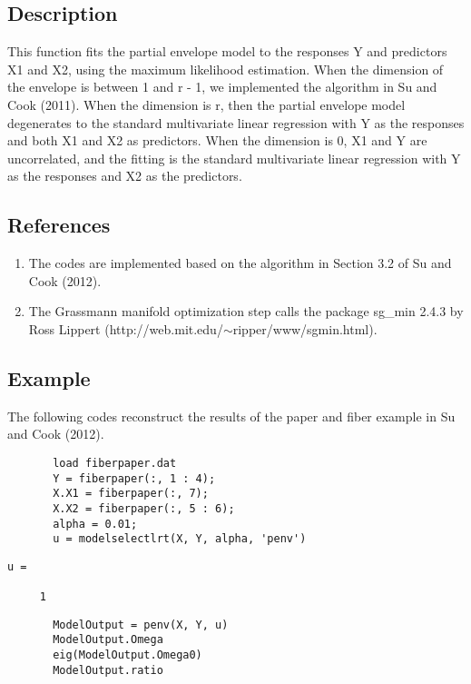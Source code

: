 \documentclass[a4paper,11pt,openany]{memoir}
\begin{document}
\subsection*{Description}

\begin{par}
This function fits the partial envelope model to the responses Y and predictors X1 and X2, using the maximum likelihood estimation.  When the dimension of the envelope is between 1 and r - 1, we implemented the algorithm in Su and Cook (2011).  When the dimension is r, then the partial envelope model degenerates to the standard multivariate linear regression with Y as the responses and both X1 and X2 as predictors.  When the dimension is 0, X1 and Y are uncorrelated, and the fitting is the standard multivariate linear regression with Y as the responses and X2 as the predictors.
\end{par} \vspace{1em}


\subsection*{References}

\begin{enumerate}
\setlength{\itemsep}{-1ex}
   \item The codes are implemented based on the algorithm in Section 3.2 of Su and Cook (2012).
   \item The Grassmann manifold optimization step calls the package sg\_min 2.4.3 by Ross Lippert (http://web.mit.edu/$\sim$ripper/www/sgmin.html).
\end{enumerate}


\subsection*{Example}

\begin{par}
The following codes reconstruct the results of the paper and fiber example in Su and Cook (2012).
\end{par} \vspace{1em}

\begin{verbatim}       load fiberpaper.dat
       Y = fiberpaper(:, 1 : 4);
       X.X1 = fiberpaper(:, 7);
       X.X2 = fiberpaper(:, 5 : 6);
       alpha = 0.01;
       u = modelselectlrt(X, Y, alpha, 'penv')\end{verbatim}
        \color{lightgray}\ttfamily \begin{verbatim}
u =

     1
\end{verbatim} \rmfamily
\color{black}
       \begin{verbatim}
       ModelOutput = penv(X, Y, u)
       ModelOutput.Omega
       eig(ModelOutput.Omega0)
       ModelOutput.ratio\end{verbatim}
    
\end{document}

